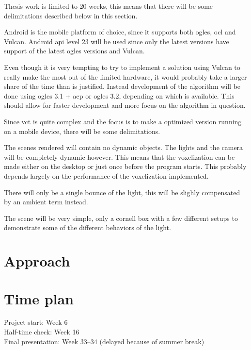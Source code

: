 \documentclass[a4paper, 12pt]{article}
\begin{document}
Thesis work is limited to 20 weeks, this means that there will be some delimitations described below in this section.

Android is the mobile platform of choice, since it supports both \gls{ogles}, \gls{ocl} and Vulcan. Android \acrshort{api} level 23 will be used since only the latest versions have support of the latest \gls{ogles} versions and Vulcan.

Even though it is very tempting to try to implement a solution using Vulcan to really make the most out of the limited hardware, it would probably take a larger share of the time than is justified. Instead development of the algorithm will be done using \gls{ogles} 3.1 + \gls{aep} or \gls{ogles} 3.2, depending on which is available. This should allow for faster development and more focus on the algorithm in question.


Since vct is quite complex and the focus is to make a optimized version running on a mobile device, there will be some delimitations.

The scenes rendered will contain no dynamic objects. The lights and the camera will be completely dynamic however. This means that the voxelization can be made either on the desktop or just once before the program starts. This probably depends largely on the performance of the voxelization implemented.

There will only be a single bounce of the light, this will be slighly compensated by an ambient term instead.

The scene will be very simple, only a cornell box with a few different setups to demonstrate some of the different behaviors of the light.


\section{Approach}
\label{sec:Approach}


\section{Time plan}
\label{sec:Time plan}

Project start: Week 6 \\
Half-time check: Week 16 \\
Final presentation: Week 33--34 (delayed because of summer break)
\end{document}
